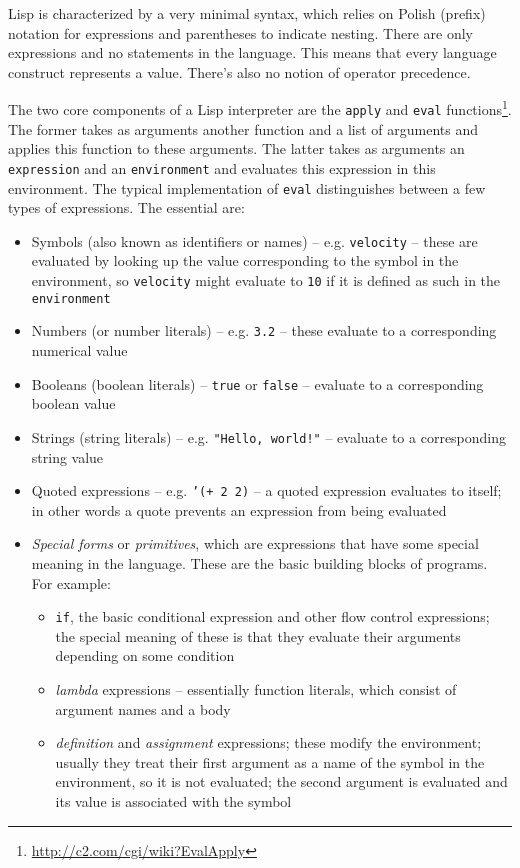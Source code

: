 Lisp is characterized by a very minimal syntax, which relies on Polish (prefix)
notation for expressions and parentheses to indicate nesting. There are only
expressions and no statements in the language. This means that every language
construct represents a value. There's also no notion of operator precedence.

The two core components of a Lisp interpreter are the \texttt{apply} and
\texttt{eval}
functions\cite{sicp_meta}\footnote{\url{http://c2.com/cgi/wiki?EvalApply}}. The
former takes as arguments another function and a list of arguments and applies
this function to these arguments. The latter takes as arguments an
\texttt{expression} and an \texttt{environment} and evaluates this expression in
this environment. The typical implementation of \texttt{eval} distinguishes
between a few types of expressions. The essential are:
\begin{itemize}
	\item Symbols (also known as identifiers or names) --
          e.g. \texttt{velocity} -- these are evaluated by looking up the value
          corresponding to the symbol in the environment, so \texttt{velocity}
          might evaluate to \texttt{10} if it is defined as such in the
          \texttt{environment}
	\item Numbers (or number literals) -- e.g. \texttt{3.2} -- these
          evaluate to a corresponding numerical value
	\item Booleans (boolean literals) -- \texttt{true} or \texttt{false} --
          evaluate to a corresponding boolean value
	\item Strings (string literals) -- e.g. \texttt{"Hello, world!"} --
          evaluate to a corresponding string value
	\item Quoted expressions -- e.g. \texttt{'(+ 2 2)} -- a quoted
          expression evaluates to itself; in other words a quote prevents an
          expression from being evaluated
	\item \textit{Special forms} or \textit{primitives}, which are
          expressions that have some special meaning in the language. These are
          the basic building blocks of programs. For example:
	\begin{itemize}
		\item \texttt{if}, the basic conditional expression and other
                  flow control expressions; the special meaning of these is that
                  they evaluate their arguments depending on some condition
		\item \textit{lambda} expressions -- essentially function
                  literals, which consist of argument names and a body
		\item \textit{definition} and \textit{assignment} expressions;
                  these modify the environment; usually they treat their first
                  argument as a name of the symbol in the environment, so it is
                  not evaluated; the second argument is evaluated and its value
                  is associated with the symbol
	\end{itemize}	 
\end{itemize}

